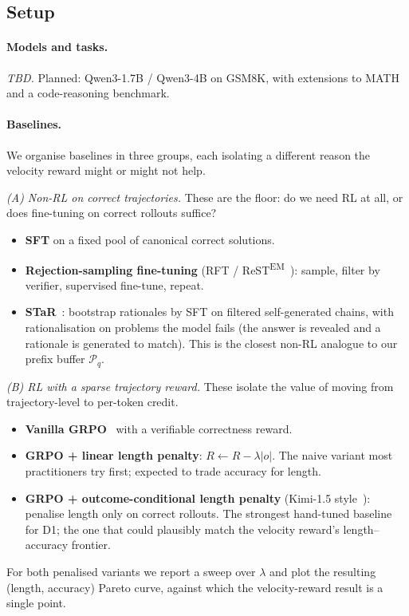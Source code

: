 \documentclass{article}
\begin{document}
\subsection{Setup}

\paragraph{Models and tasks.}
\textit{TBD.} Planned: Qwen3-1.7B / Qwen3-4B on GSM8K, with extensions to
MATH and a code-reasoning benchmark.

\paragraph{Baselines.}
We organise baselines in three groups, each isolating a different reason
the velocity reward might or might not help.

\textit{(A) Non-RL on correct trajectories.} These are the floor: do we
need RL at all, or does fine-tuning on correct rollouts suffice?
\begin{itemize}
  \item \textbf{SFT} on a fixed pool of canonical correct solutions.
  \item \textbf{Rejection-sampling fine-tuning} (RFT / ReST\textsuperscript{EM}~\citep{yuan2023rft, singh2023restem}):
        sample, filter by verifier, supervised fine-tune, repeat.
  \item \textbf{STaR}~\citep{zelikman2022star}: bootstrap rationales by
        SFT on filtered self-generated chains, with rationalisation on
        problems the model fails (the answer is revealed and a rationale
        is generated to match). This is the closest non-RL analogue to
        our prefix buffer \(\mathcal{P}_q\).
\end{itemize}

\textit{(B) RL with a sparse trajectory reward.} These isolate the value
of moving from trajectory-level to per-token credit.
\begin{itemize}
  \item \textbf{Vanilla GRPO}~\citep{shao2024deepseekmath, deepseek2025r1}
        with a verifiable correctness reward.
  \item \textbf{GRPO + linear length penalty}: \(R \leftarrow R - \lambda |o|\).
        The naive variant most practitioners try first; expected to trade
        accuracy for length.
  \item \textbf{GRPO + outcome-conditional length penalty} (Kimi-1.5
        style~\citep{kimi2025k15}): penalise length only on correct
        rollouts. The strongest hand-tuned baseline for D1; the one that
        could plausibly match the velocity reward's
        length--accuracy frontier.
\end{itemize}
For both penalised variants we report a sweep over \(\lambda\) and plot
the resulting (length, accuracy) Pareto curve, against which the
velocity-reward result is a single point.
\end{document}
